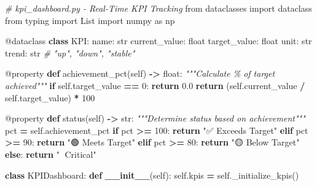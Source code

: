 \documentclass[
]{article}
\newenvironment{Shaded}{\begin{snugshade}}{\end{snugshade}}
\newcommand{\AttributeTok}[1]{\textcolor[rgb]{0.13,0.29,0.53}{#1}}
\newcommand{\BuiltInTok}[1]{#1}
\newcommand{\CommentTok}[1]{\textcolor[rgb]{0.56,0.35,0.01}{\textit{#1}}}
\newcommand{\ControlFlowTok}[1]{\textcolor[rgb]{0.13,0.29,0.53}{\textbf{#1}}}
\newcommand{\DecValTok}[1]{\textcolor[rgb]{0.00,0.00,0.81}{#1}}
\newcommand{\FloatTok}[1]{\textcolor[rgb]{0.00,0.00,0.81}{#1}}
\newcommand{\FunctionTok}[1]{\textcolor[rgb]{0.13,0.29,0.53}{\textbf{#1}}}
\newcommand{\ImportTok}[1]{#1}
\newcommand{\KeywordTok}[1]{\textcolor[rgb]{0.13,0.29,0.53}{\textbf{#1}}}
\newcommand{\NormalTok}[1]{#1}
\newcommand{\OperatorTok}[1]{\textcolor[rgb]{0.81,0.36,0.00}{\textbf{#1}}}
\newcommand{\StringTok}[1]{\textcolor[rgb]{0.31,0.60,0.02}{#1}}
\newcommand{\VariableTok}[1]{\textcolor[rgb]{0.00,0.00,0.00}{#1}}
\begin{document}
\begin{Shaded}
\begin{Highlighting}[]
\CommentTok{\# kpi\_dashboard.py {-} Real{-}Time KPI Tracking}
\ImportTok{from}\NormalTok{ dataclasses }\ImportTok{import}\NormalTok{ dataclass}
\ImportTok{from}\NormalTok{ typing }\ImportTok{import}\NormalTok{ List}
\ImportTok{import}\NormalTok{ numpy }\ImportTok{as}\NormalTok{ np}

\AttributeTok{@dataclass}
\KeywordTok{class}\NormalTok{ KPI:}
\NormalTok{    name: }\BuiltInTok{str}
\NormalTok{    current\_value: }\BuiltInTok{float}
\NormalTok{    target\_value: }\BuiltInTok{float}
\NormalTok{    unit: }\BuiltInTok{str}
\NormalTok{    trend: }\BuiltInTok{str}  \CommentTok{\# "up", "down", "stable"}

    \AttributeTok{@property}
    \KeywordTok{def}\NormalTok{ achievement\_pct(}\VariableTok{self}\NormalTok{) }\OperatorTok{{-}\textgreater{}} \BuiltInTok{float}\NormalTok{:}
        \CommentTok{"""Calculate \% of target achieved"""}
        \ControlFlowTok{if} \VariableTok{self}\NormalTok{.target\_value }\OperatorTok{==} \DecValTok{0}\NormalTok{:}
            \ControlFlowTok{return} \FloatTok{0.0}
        \ControlFlowTok{return}\NormalTok{ (}\VariableTok{self}\NormalTok{.current\_value }\OperatorTok{/} \VariableTok{self}\NormalTok{.target\_value) }\OperatorTok{*} \DecValTok{100}

    \AttributeTok{@property}
    \KeywordTok{def}\NormalTok{ status(}\VariableTok{self}\NormalTok{) }\OperatorTok{{-}\textgreater{}} \BuiltInTok{str}\NormalTok{:}
        \CommentTok{"""Determine status based on achievement"""}
\NormalTok{        pct }\OperatorTok{=} \VariableTok{self}\NormalTok{.achievement\_pct}
        \ControlFlowTok{if}\NormalTok{ pct }\OperatorTok{\textgreater{}=} \DecValTok{100}\NormalTok{:}
            \ControlFlowTok{return} \StringTok{"✅ Exceeds Target"}
        \ControlFlowTok{elif}\NormalTok{ pct }\OperatorTok{\textgreater{}=} \DecValTok{90}\NormalTok{:}
            \ControlFlowTok{return} \StringTok{"🟢 Meets Target"}
        \ControlFlowTok{elif}\NormalTok{ pct }\OperatorTok{\textgreater{}=} \DecValTok{80}\NormalTok{:}
            \ControlFlowTok{return} \StringTok{"🟡 Below Target"}
        \ControlFlowTok{else}\NormalTok{:}
            \ControlFlowTok{return} \StringTok{"🔴 Critical"}

\KeywordTok{class}\NormalTok{ KPIDashboard:}
    \KeywordTok{def} \FunctionTok{\_\_init\_\_}\NormalTok{(}\VariableTok{self}\NormalTok{):}
        \VariableTok{self}\NormalTok{.kpis }\OperatorTok{=} \VariableTok{self}\NormalTok{.\_initialize\_kpis()}


\end{Highlighting}
\end{Shaded}
\end{document}
